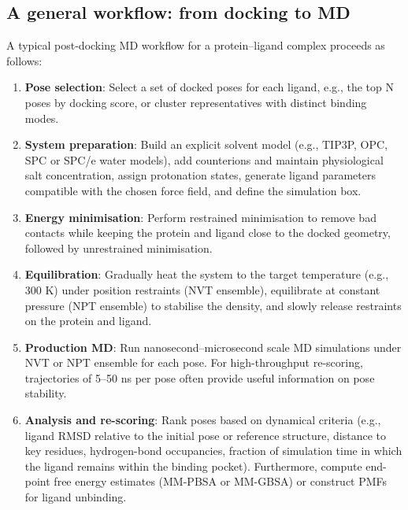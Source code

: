 \documentclass[12pt]{article}
\begin{document}
\subsection{A general workflow: from docking to MD}

A typical post-docking MD workflow for a protein--ligand complex proceeds as follows:

\begin{enumerate}
\item \textbf{Pose selection}: Select a set of docked poses for each ligand, e.g., the top N poses by docking score, or cluster representatives with distinct binding modes.

\item \textbf{System preparation}: Build an explicit solvent model (e.g., TIP3P\cite{CH9_jorgensen1983comparison}, OPC\cite{CH9_izadi2014building}, SPC\cite{CH9_mark2001structure} or SPC/e\cite{CH9_mark2001structure} water models), add counterions and maintain physiological salt concentration, assign protonation states, generate ligand parameters compatible with the chosen force field, and define the simulation box.

\item \textbf{Energy minimisation}: Perform restrained minimisation to remove bad contacts while keeping the protein and ligand close to the docked geometry, followed by unrestrained minimisation.

\item \textbf{Equilibration}: Gradually heat the system to the target temperature (e.g., 300 K) under position restraints (NVT ensemble), equilibrate at constant pressure (NPT ensemble) to stabilise the density, and slowly release restraints on the protein and ligand.

\item \textbf{Production MD}: Run nanosecond--microsecond scale MD simulations under NVT or NPT ensemble for each pose. For high-throughput re-scoring, trajectories of 5--50 ns per pose often provide useful information on pose stability.

\item \textbf{Analysis and re-scoring}: Rank poses based on dynamical criteria (e.g., ligand RMSD relative to the initial pose or reference structure, distance to key residues, hydrogen-bond occupancies, fraction of simulation time in which the ligand remains within the binding pocket). Furthermore, compute end-point free energy estimates (MM-PBSA or MM-GBSA) or construct PMFs for ligand unbinding.
\end{enumerate}
\end{document}
